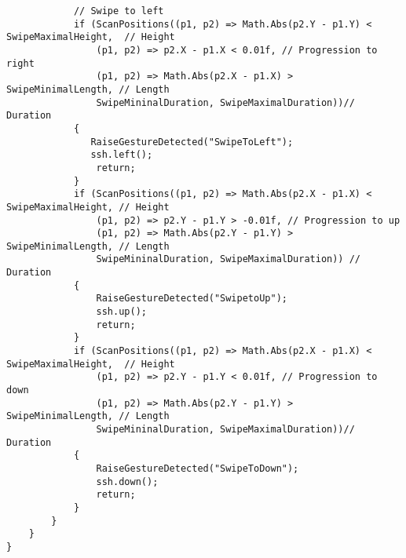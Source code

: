 \begin{lstlisting}
            // Swipe to left
            if (ScanPositions((p1, p2) => Math.Abs(p2.Y - p1.Y) < SwipeMaximalHeight,  // Height
                (p1, p2) => p2.X - p1.X < 0.01f, // Progression to right
                (p1, p2) => Math.Abs(p2.X - p1.X) > SwipeMinimalLength, // Length
                SwipeMininalDuration, SwipeMaximalDuration))// Duration
            {
               RaiseGestureDetected("SwipeToLeft");
               ssh.left();
                return;
            }
            if (ScanPositions((p1, p2) => Math.Abs(p2.X - p1.X) < SwipeMaximalHeight, // Height
                (p1, p2) => p2.Y - p1.Y > -0.01f, // Progression to up
                (p1, p2) => Math.Abs(p2.Y - p1.Y) > SwipeMinimalLength, // Length
                SwipeMininalDuration, SwipeMaximalDuration)) // Duration
            {
                RaiseGestureDetected("SwipetoUp");
                ssh.up();
                return;
            }
            if (ScanPositions((p1, p2) => Math.Abs(p2.X - p1.X) < SwipeMaximalHeight,  // Height
                (p1, p2) => p2.Y - p1.Y < 0.01f, // Progression to down
                (p1, p2) => Math.Abs(p2.Y - p1.Y) > SwipeMinimalLength, // Length
                SwipeMininalDuration, SwipeMaximalDuration))// Duration
            {
                RaiseGestureDetected("SwipeToDown");
                ssh.down();
                return;
            }
        }
    }
}
\end{lstlisting}       
